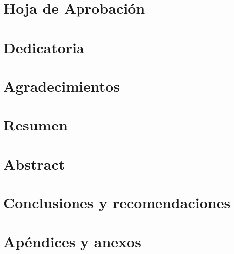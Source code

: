 \documentclass[11pt, sfdefaults=false, spanish]{scrreprt}
\begin{document}


\chapter*{Hoja de Aprobación}
\chapter*{Dedicatoria}
\chapter*{Agradecimientos}

\chapter*{Resumen}
\chapter*{Abstract}

\tableofcontents
\listoftables
\listoffigures











\chapter{Conclusiones y recomendaciones}

\printbibliography

\clearpage

\chapter{Apéndices y anexos}
\end{document}

